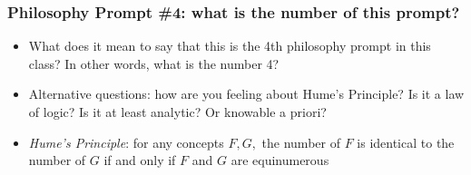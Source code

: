 \fi %

\begin{frame}
\frametitle{Philosophy Prompt \#4: what is the number of this prompt?}

\begin{itemize}[<+->]

\item What does it mean to say that this is the 4th philosophy prompt in this class? In other words, what is the number 4?

\item Alternative questions: how are you feeling about Hume's Principle? Is it a law of logic? Is it at least analytic? Or knowable a priori? 

\item \emph{Hume's Principle}: for any concepts $F, G,$ the number of $F $ is identical to the number of $G $ if and only if $F$ and $G$ are equinumerous

\end{itemize}
\end{frame}

